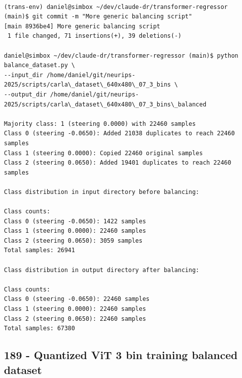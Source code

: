 \begin{verbatim}

(trans-env) daniel@simbox ~/dev/claude-dr/transformer-regressor (main)$ git commit -m "More generic balancing script"
[main 8936be4] More generic balancing script
 1 file changed, 71 insertions(+), 39 deletions(-)

daniel@simbox ~/dev/claude-dr/transformer-regressor (main)$ python balance_dataset.py \
--input_dir /home/daniel/git/neurips-2025/scripts/carla\_dataset\_640x480\_07_3_bins \
--output_dir /home/daniel/git/neurips-2025/scripts/carla\_dataset\_640x480\_07_3_bins\_balanced

Majority class: 1 (steering 0.0000) with 22460 samples
Class 0 (steering -0.0650): Added 21038 duplicates to reach 22460 samples
Class 1 (steering 0.0000): Copied 22460 original samples
Class 2 (steering 0.0650): Added 19401 duplicates to reach 22460 samples

Class distribution in input directory before balancing:

Class counts:
Class 0 (steering -0.0650): 1422 samples
Class 1 (steering 0.0000): 22460 samples
Class 2 (steering 0.0650): 3059 samples
Total samples: 26941

Class distribution in output directory after balancing:

Class counts:
Class 0 (steering -0.0650): 22460 samples
Class 1 (steering 0.0000): 22460 samples
Class 2 (steering 0.0650): 22460 samples
Total samples: 67380

\end{verbatim}

\subsection{189 - Quantized ViT 3 bin training balanced dataset}
\label{app_res:189}

